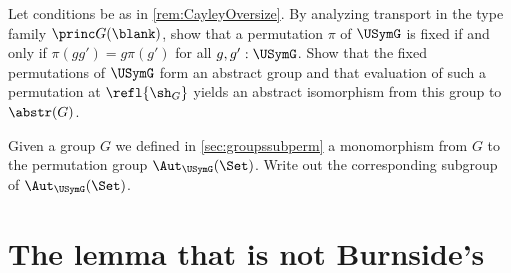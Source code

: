 \begin{xca}\label{xca:PP-fixed-permutations} 
Let conditions be as in \cref{rem:CayleyOversize}.
By analyzing transport in the type family $\princ G(\blank)$,
show that a permutation $\pi$ of $\USymG$
is fixed if and only if $\pi(gg')=g\pi(g')$ for all $g,g':\USymG$.
Show that the fixed permutations of $\USymG$ form an abstract group
and that evaluation of such a permutation at $\refl{\sh_G}$
yields an abstract isomorphism from this group to $\abstr(G)$.
\end{xca}
  

\begin{xca} 
    Given a group $G$ we defined in \cref{sec:groupssubperm} a monomorphism from $G$ to the permutation group $\Aut_{\USymG}(\Set)$. Write out the corresponding subgroup of $\Aut_{\USymG}(\Set)$.
  \end{xca}

\section{The lemma that is not Burnside's}
\label{sec:burnsides-lemma}
\label{lem:burnsides-lemma}

